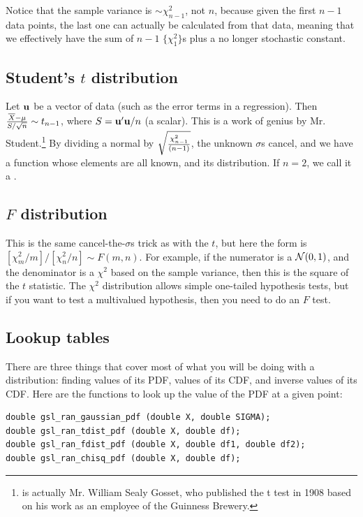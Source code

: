 Notice that the sample variance is $\sim
\chi^2_{n-1}$, not $n$, because given the first $n-1$ data points, the
last one can actually be calculated from that data, meaning that we
effectively have the sum of $n-1$ $\{\chi^2_1\}$s plus a no longer
stochastic constant.

\subsection{Student's $t$ distribution} Let ${\bf u}$ be
a vector of data (such as the error terms in a regression). Then
${\overline X - \mu \over S/\sqrt{n}}\sim
t_{n-1}$, where $S={\bf u}'{\bf u}/n$ (a scalar). This is a work of genius by
Mr. Student.\footnote{ is actually Mr. William Sealy
Gosset, who published the t test in 1908 based on his work as an employee
of the Guinness Brewery.  }
By dividing a normal by $\sqrt{\chi^2_{n-1}\over (n-1)}$, the unknown
$\sigma$s cancel, and we have a function whose elements are all known,
and its distribution.  If $n=2$, we call it a .
\label{tstat}


\subsection{$F$ distribution}  This is the same cancel-the-$\sigma$s trick as with the $t$, but here the form
is $[\chi^2_m/m]/[\chi^2_n/n]\sim F(m,n)$. For example, if the numerator
is a ${\cal N}(0,1)$, and the denominator is a $\chi^2$ based on the
sample variance, then this is the square of the $t$ statistic.
The $\chi^2$ distribution 
allows simple one-tailed hypothesis tests, but if you want to test a
multivalued hypothesis, then you need to do an $F$ test.

\subsection{Lookup tables}
There are three things that cover most of what you will be doing with a
distribution: finding values of its PDF, values of its CDF, and inverse
values of its CDF.
Here are the functions to look up the value of the PDF at a given point:

\begin{lstlisting}
double gsl_ran_gaussian_pdf (double X, double SIGMA);
double gsl_ran_tdist_pdf (double X, double df);
double gsl_ran_fdist_pdf (double X, double df1, double df2);
double gsl_ran_chisq_pdf (double X, double df);
\end{lstlisting}


